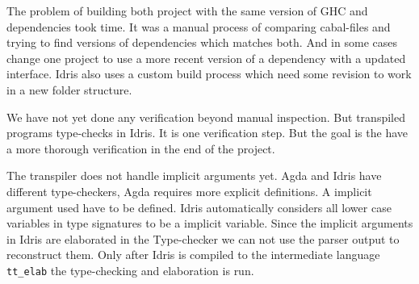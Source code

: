 \documentclass[parskip=half]{scrartcl}
\begin{document}


The problem of building both project with the same version of GHC and
dependencies took time. It was a manual process of comparing cabal-files and
trying to find versions of dependencies which matches both. And in some cases
change one project to use a more recent version of a dependency with a updated
interface. Idris also uses a custom build process which need some revision to
work in a new folder structure.



We have not yet done any verification beyond manual inspection.  But transpiled
programs type-checks in Idris. It is one verification step.  But the goal is
the have a more thorough verification in the end of the project.



The transpiler does not handle implicit arguments yet. Agda and Idris have
different type-checkers, Agda requires more explicit definitions. A implicit
argument used have to be defined. Idris automatically considers all lower case
variables in type signatures to be a implicit variable. Since the implicit
arguments in Idris are elaborated in the Type-checker we can not use the parser
output to reconstruct them.  Only after Idris is compiled to the intermediate
language \texttt{tt\_elab} the type-checking and elaboration is run.
\end{document}
